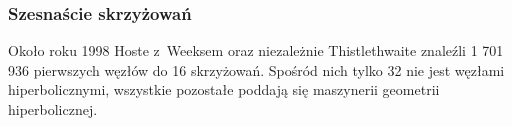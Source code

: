 
\subsubsection{Szesnaście skrzyżowań}
Około roku 1998 Hoste z~Weeksem \cite{thistlethwaite98} oraz niezależnie Thistlethwaite znaleźli 1 701 936 pierwszych węzłów do 16 skrzyżowań.
%
%
%
Spośród nich tylko 32 nie jest węzłami hiperbolicznymi, wszystkie pozostałe poddają się maszynerii geometrii hiperbolicznej.

